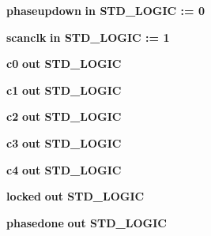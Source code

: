 \begin{DoxyCompactItemize}
\item 
{\bf phaseupdown}  {\bfseries {\bfseries \textcolor{keywordflow}{in}\textcolor{vhdlchar}{ }}} {\bfseries \textcolor{comment}{S\+T\+D\+\_\+\+L\+O\+G\+IC}\textcolor{vhdlchar}{ }\textcolor{vhdlchar}{ }\textcolor{vhdlchar}{\+:}\textcolor{vhdlchar}{=}\textcolor{vhdlchar}{ }\textcolor{vhdlchar}{ }\textcolor{vhdlchar}{\textquotesingle{}}\textcolor{vhdlchar}{ } \textcolor{vhdldigit}{0} \textcolor{vhdlchar}{ }\textcolor{vhdlchar}{\textquotesingle{}}\textcolor{vhdlchar}{ }} 
\item 
{\bf scanclk}  {\bfseries {\bfseries \textcolor{keywordflow}{in}\textcolor{vhdlchar}{ }}} {\bfseries \textcolor{comment}{S\+T\+D\+\_\+\+L\+O\+G\+IC}\textcolor{vhdlchar}{ }\textcolor{vhdlchar}{ }\textcolor{vhdlchar}{\+:}\textcolor{vhdlchar}{=}\textcolor{vhdlchar}{ }\textcolor{vhdlchar}{ }\textcolor{vhdlchar}{\textquotesingle{}}\textcolor{vhdlchar}{ } \textcolor{vhdldigit}{1} \textcolor{vhdlchar}{ }\textcolor{vhdlchar}{\textquotesingle{}}\textcolor{vhdlchar}{ }} 
\item 
{\bf c0}  {\bfseries {\bfseries \textcolor{keywordflow}{out}\textcolor{vhdlchar}{ }}} {\bfseries \textcolor{comment}{S\+T\+D\+\_\+\+L\+O\+G\+IC}\textcolor{vhdlchar}{ }} 
\item 
{\bf c1}  {\bfseries {\bfseries \textcolor{keywordflow}{out}\textcolor{vhdlchar}{ }}} {\bfseries \textcolor{comment}{S\+T\+D\+\_\+\+L\+O\+G\+IC}\textcolor{vhdlchar}{ }} 
\item 
{\bf c2}  {\bfseries {\bfseries \textcolor{keywordflow}{out}\textcolor{vhdlchar}{ }}} {\bfseries \textcolor{comment}{S\+T\+D\+\_\+\+L\+O\+G\+IC}\textcolor{vhdlchar}{ }} 
\item 
{\bf c3}  {\bfseries {\bfseries \textcolor{keywordflow}{out}\textcolor{vhdlchar}{ }}} {\bfseries \textcolor{comment}{S\+T\+D\+\_\+\+L\+O\+G\+IC}\textcolor{vhdlchar}{ }} 
\item 
{\bf c4}  {\bfseries {\bfseries \textcolor{keywordflow}{out}\textcolor{vhdlchar}{ }}} {\bfseries \textcolor{comment}{S\+T\+D\+\_\+\+L\+O\+G\+IC}\textcolor{vhdlchar}{ }} 
\item 
{\bf locked}  {\bfseries {\bfseries \textcolor{keywordflow}{out}\textcolor{vhdlchar}{ }}} {\bfseries \textcolor{comment}{S\+T\+D\+\_\+\+L\+O\+G\+IC}\textcolor{vhdlchar}{ }} 
\item 
{\bf phasedone}  {\bfseries {\bfseries \textcolor{keywordflow}{out}\textcolor{vhdlchar}{ }}} {\bfseries \textcolor{comment}{S\+T\+D\+\_\+\+L\+O\+G\+IC}\textcolor{vhdlchar}{ }} 
\end{DoxyCompactItemize}


